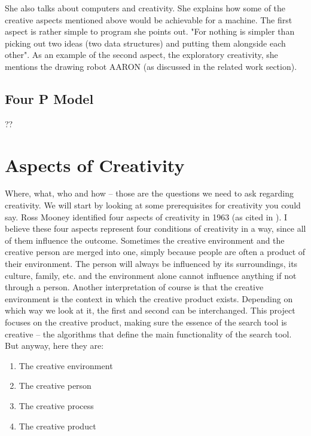 She also talks about computers and creativity. She explains how some of the creative aspects mentioned above would be achievable for a machine.  The first aspect is rather simple to program she points out. "For nothing is simpler than picking out two ideas (two data structures) and putting them alongside each other". As an example of the second aspect, the exploratory creativity, she mentions the drawing robot AARON (as discussed in the related work section).

\subsection{Four P Model}

??

\section{Aspects of Creativity}

Where, what, who and how – those are the questions we need to ask regarding creativity. We will start by looking at some prerequisites for creativity you could say. Ross Mooney identified four aspects of creativity in 1963 (as cited in \citep{Sternberg1988}). I believe these four aspects represent four conditions of creativity in a way, since all of them influence the outcome. Sometimes the creative environment and the creative person are merged into one, simply because people are often a product of their environment. The person will always be influenced by its surroundings, its culture, family, etc. and the environment alone cannot influence anything if not through a person. Another interpretation of course is that the creative environment is the context in which the creative product exists. Depending on which way we look at it, the first and second can be interchanged. This project focuses on the creative product, making sure the essence of the search tool is creative – the algorithms that define the main functionality of the search tool. But anyway, here they are:

\begin{enumerate}
  \item The creative environment
  \item The creative person
  \item The creative process
  \item The creative product
\end{enumerate}

